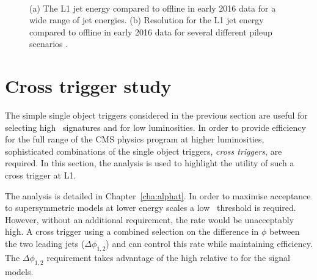 \begin{figure}
\centering
	~
	\caption{(a) The L1 jet energy compared to offline in early 2016 data for a wide
range of jet energies. (b) Resolution for the L1 jet energy compared to offline in early 2016 data for several different 
pileup scenarios \cite{l1sums_perf}.}
\label{fig:trig_2016}
\end{figure}


\section{Cross trigger study}
\label{sec:cross_trigger}
The simple single object triggers considered in the previous section are useful for selecting
high \pt~signatures and for low luminosities. In order to provide efficiency for
the full range of the CMS physics program at higher luminosities, sophisticated combinations
of the single object triggers, \emph{cross triggers}, are required. In this section, the \alphat 
analysis is used to highlight the utility of such a cross trigger at L1. 

The \alphat analysis is detailed in Chapter~\ref{cha:alphat}. In order to maximise acceptance
to supersymmetric models at lower energy scales a low \scalht~threshold is required. 
However, without an additional requirement, the rate
would be unacceptably high. A cross trigger using a combined selection on the difference 
in $\phi$ between the two leading jets ($\Delta\phi_{1,2}$) and \scalht can control this rate while 
maintaining efficiency. The $\Delta\phi_{1,2}$ requirement takes advantage of the high relative 
\mht to \scalht for the signal models.

